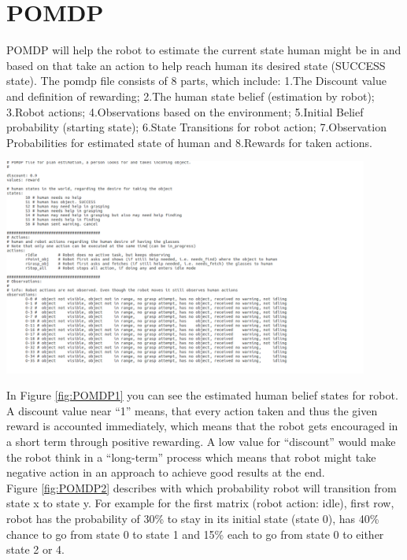 \clearpage

\section{POMDP}

POMDP will help the robot to estimate the current state human might be in and based on that take an action to help reach human its desired state (SUCCESS state). The pomdp file consists of 8 parts, which include: 1.The Discount value and definition of rewarding; 2.The human state belief (estimation by robot); 3.Robot actions; 4.Observations based on the environment; 5.Initial Belief probability (starting state); 6.State Transitions for robot action; 7.Observation Probabilities for estimated state of human and 8.Rewards for taken actions.

\begin{minipage}{0.8\textwidth}
\centering
	\includegraphics[width=12cm]{Pictures/func/POMDP/POMDP1.png}
	\label{fig:POMDP1}
\end{minipage}

In Figure \ref{fig:POMDP1} you can see the estimated human belief states for robot. A discount value near “1” means, that every action taken and thus the given reward is accounted immediately, which means that the robot gets encouraged in a short term through positive rewarding. A low value for “discount” would make the robot think in a “long-term” process which means that robot might take negative action in an approach to achieve good results at the end.\\
Figure \ref{fig:POMDP2} describes with which probability robot will transition from state x to state y. For example for the first matrix (robot action: idle), first row, robot has the probability of 30\% to stay in its initial state (state 0), has 40\% chance to go from state 0 to state 1 and 15\% each to go from state 0 to either state 2 or 4.

